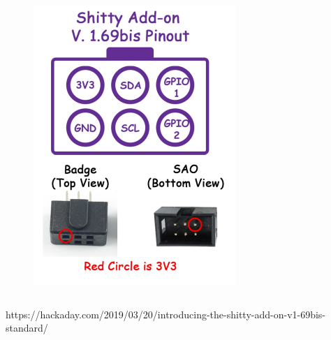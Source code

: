 \documentclass[t]{beamer}
\begin{document}
\begin{frame}
\begin{columns}[c]
\begin{figure}
	\includegraphics[width=0.9\linewidth]{sao69.png}
\end{figure}

\end{columns}

https://hackaday.com/2019/03/20/introducing-the-shitty-add-on-v1-69bis-standard/
\end{frame}

\end{document}

